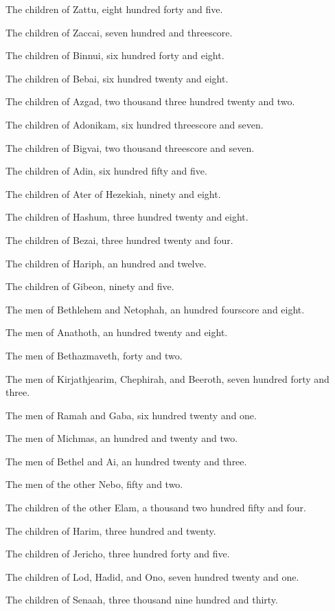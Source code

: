 \verse The children of Zattu, eight hundred forty and five.

\verse The children of Zaccai, seven hundred and threescore.

\verse The children of Binnui, six hundred forty and eight.

\verse The children of Bebai, six hundred twenty and eight.

\verse The children of Azgad, two thousand three hundred twenty and two.

\verse The children of Adonikam, six hundred threescore and seven.

\verse The children of Bigvai, two thousand threescore and seven.

\verse The children of Adin, six hundred fifty and five.

\verse The children of Ater of Hezekiah, ninety and eight.

\verse The children of Hashum, three hundred twenty and eight.

\verse The children of Bezai, three hundred twenty and four.

\verse The children of Hariph, an hundred and twelve.

\verse The children of Gibeon, ninety and five.

\verse The men of Bethlehem and Netophah, an hundred fourscore and eight.

\verse The men of Anathoth, an hundred twenty and eight.

\verse The men of Bethazmaveth, forty and two.

\verse The men of Kirjathjearim, Chephirah, and Beeroth, seven hundred forty and three.

\verse The men of Ramah and Gaba, six hundred twenty and one.

\verse The men of Michmas, an hundred and twenty and two.

\verse The men of Bethel and Ai, an hundred twenty and three.

\verse The men of the other Nebo, fifty and two.

\verse The children of the other Elam, a thousand two hundred fifty and four.

\verse The children of Harim, three hundred and twenty.

\verse The children of Jericho, three hundred forty and five.

\verse The children of Lod, Hadid, and Ono, seven hundred twenty and one.

\verse The children of Senaah, three thousand nine hundred and thirty.


